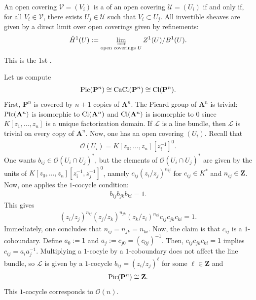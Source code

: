 \documentclass [11 pt, oneside] {article}
\begin{document}
An open covering $\mathscr{V}=(V_i)$ is a  of an open covering $\mathscr{U} = (U_i)$ if and only if, for all $V_i\in \mathscr{V}$, there exists $U_j\in \mathscr{U}$ such that $V_i\subset U_j$. All invertible sheaves are given by a direct limit over open coverings given by refinements:
\begin{align*}
	\check H^1(\mathscr{U}) := \varinjlim_{\textrm{open coverings $\mathscr{U}$}} Z^1(\mathscr{U})/B^1(\mathscr{U}).
\end{align*}
This is the $1$st .

\begin{example}[ ]\label{}\text{}
Let us compute
\begin{align*}
	\Pic(\mathbf{P}^n)\isomto \CaCl(\mathbf{P}^n)\isomto \Cl(\mathbf{P}^n).
\end{align*}
First, $\mathbf{P}^n$ is covered by $n+1$ copies of $\mathbf{A}^n$. The Picard group of $\mathbf{A}^n$ is trivial: $\Pic(\mathbf{A}^n)$ is isomorphic to $\Cl(\mathbf{A}^n)$ and $\Cl(\mathbf{A}^n)$ is isomorphic to $0$ since $K[z_1,\hdots, z_n]$ is a unique factorization domain.
If $\mathscr{L}$ is a line bundle, then $\mathscr{L}$ is trivial on every copy of $\mathbf{A}^n$. Now, one has an open covering $(U_i)$. Recall that \begin{align*}
	\mathscr{O}(U_i) = K[ z_0,\hdots, z_n][z_i^{-1}]^0.
\end{align*}
One wants $b_{ij}\in \mathscr{O}(U_i\cap U_j) ^*$, but the elements of $\mathscr{O}(U_i\cap U_j)^*$ are given by the units of $K[z_0,\hdots, z_n][z_i^{-1},z_j^{-1}]^0$, namely $c_{ij}(z_i/z_j)^{n_{ij}}$ for $c_{ij}\in K^*$ and $n_{ij}\in \mathbf{Z}$. Now, one applies the $1$-cocycle condition:
\begin{align*}
	b_{ij}b_{jk}b_{ki}=1.
\end{align*}
This gives
\begin{align*}
	(z_i/z_j)^{n_{ij}}  (z_j/z_k)^{n_{jk}} (z_k/z_i)^{n_{ki}}c_{ij}c_{jk}c_{ki} = 1.
\end{align*}
Immediately, one concludes that $n_{ij}=n_{jk}=n_{ki}$. Now, the claim is that $c_{ij}$ is a $1$-coboundary. Define $a_0:=1$ and $a_j := c_{j0} = (c_{0j})^{-1}$.
Then, $c_{ij}c_{jk}c_{ki}=1$ implies $c_{ij} = a_ia_j^{-1}$.
Multiplying a $1$-cocyle by a $1$-coboundary does not affect the line bundle, so $\mathscr{L}$ is given by a $1$-cocycle $b_{ij} = (z_i/z_j) ^\ell$ for some $\ell \in \mathbf{Z}$ and
\begin{align*}
	\Pic(\mathbf{P}^n)\isomto \mathbf{Z}.
\end{align*}
This $1$-cocycle corresponds to $\mathscr{O}(n)$.
\end{example}
\end{document}

